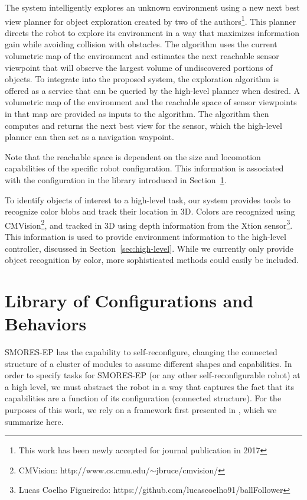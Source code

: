 \documentclass[conference]{IEEEtran}
\begin{document}
The system intelligently explores an unknown environment using a new next best view planner for object exploration created by two of the authors\footnote{This work has been newly accepted for journal publication in 2017}. This planner directs the robot to explore its environment in a way that maximizes information gain while avoiding collision with obstacles. The algorithm uses the current volumetric map of the environment and estimates the next reachable sensor viewpoint that will observe the largest volume of undiscovered portions of objects. To integrate into the proposed system, the exploration algorithm is offered as a service that can be queried by the high-level planner when desired. A volumetric map of the environment and the reachable space of sensor viewpoints in that map are provided as inputs to the algorithm. The algorithm then computes and returns the next best view for the sensor, which the high-level planner can then set as a navigation waypoint.

Note that the reachable space is dependent on the size and locomotion capabilities of the specific robot configuration. This information is associated with the configuration in the library introduced in Section~\ref{sec:configuration-specifics}.

To identify objects of interest to a high-level task, our system provides tools to recognize color blobs and track their location in 3D.  Colors are recognized using CMVision\footnote{CMVision: http://www.cs.cmu.edu/$\sim$jbruce/cmvision/}, and tracked in 3D using depth information from the Xtion sensor\footnote{Lucas Coelho Figueiredo: https://github.com/lucascoelho91/ballFollower}. This information is used to provide environment information to the high-level controller, discussed in Section~\ref{sec:high-level}.  While we currently only provide object recognition by color, more sophisticated methods could easily be included. 
%

\section{Library of Configurations and Behaviors}
\label{sec:configuration-specifics}
%
SMORES-EP has the capability to self-reconfigure, changing the connected structure of a cluster of modules to assume different shapes and capabilities.  In order to specify tasks for SMORES-EP (or any other self-reconfigurable robot) at a high level, we must abstract the robot in a way that captures the fact that its capabilities are a function of its configuration (connected structure). For the purposes of this work, we rely on a framework first presented in \cite{Jing2016}, which we summarize here.
\end{document}
